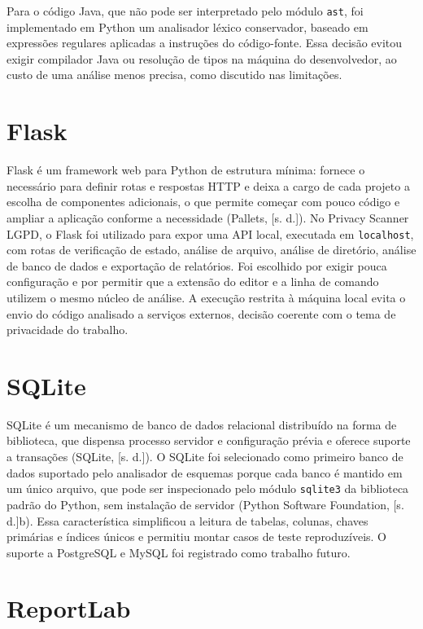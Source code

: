 \documentclass[12pt,a4paper,oneside]{report}
\begin{document}
Para o código Java, que não pode ser interpretado pelo módulo \texttt{ast}, foi implementado em Python um analisador léxico conservador, baseado em expressões regulares aplicadas a instruções do código-fonte. Essa decisão evitou exigir compilador Java ou resolução de tipos na máquina do desenvolvedor, ao custo de uma análise menos precisa, como discutido nas limitações.

\section{Flask}

Flask é um framework web para Python de estrutura mínima: fornece o necessário para definir rotas e respostas HTTP e deixa a cargo de cada projeto a escolha de componentes adicionais, o que permite começar com pouco código e ampliar a aplicação conforme a necessidade (Pallets, [s. d.]). No Privacy Scanner LGPD, o Flask foi utilizado para expor uma API local, executada em \texttt{localhost}, com rotas de verificação de estado, análise de arquivo, análise de diretório, análise de banco de dados e exportação de relatórios. Foi escolhido por exigir pouca configuração e por permitir que a extensão do editor e a linha de comando utilizem o mesmo núcleo de análise. A execução restrita à máquina local evita o envio do código analisado a serviços externos, decisão coerente com o tema de privacidade do trabalho.

\section{SQLite}

SQLite é um mecanismo de banco de dados relacional distribuído na forma de biblioteca, que dispensa processo servidor e configuração prévia e oferece suporte a transações (SQLite, [s. d.]). O SQLite foi selecionado como primeiro banco de dados suportado pelo analisador de esquemas porque cada banco é mantido em um único arquivo, que pode ser inspecionado pelo módulo \texttt{sqlite3} da biblioteca padrão do Python, sem instalação de servidor (Python Software Foundation, [s. d.]b). Essa característica simplificou a leitura de tabelas, colunas, chaves primárias e índices únicos e permitiu montar casos de teste reproduzíveis. O suporte a PostgreSQL e MySQL foi registrado como trabalho futuro.

\section{ReportLab}
\end{document}

